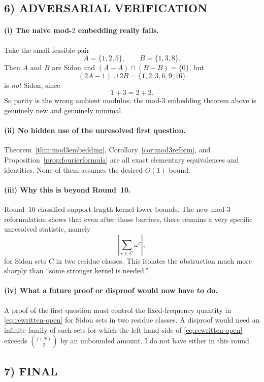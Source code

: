\subsection{6) ADVERSARIAL VERIFICATION}

\paragraph{(i) The naive mod-$2$ embedding really fails.}
Take the small feasible pair
\[
A=\{1,2,5\},
\qquad
B=\{1,3,8\}.
\]
Then $A$ and $B$ are Sidon and $(A-A)\cap(B-B)=\{0\}$, but
\[
(2A-1)\cup 2B = \{1,2,3,6,9,16\}
\]
is \emph{not} Sidon, since
\[
1+3=2+2.
\]
So parity is the wrong ambient modulus; the mod-$3$ embedding theorem above is genuinely new and genuinely minimal.

\paragraph{(ii) No hidden use of the unresolved first question.}
Theorem~\ref{thm:mod3embedding}, Corollary~\ref{cor:mod3reform}, and Proposition~\ref{prop:fourierformula} are all exact elementary equivalences and identities.  None of them assumes the desired $O(1)$ bound.

\paragraph{(iii) Why this is beyond Round~10.}
Round~10 classified support-length kernel lower bounds.  The new mod-$3$ reformulation shows that even after those barriers, there remains a very specific unresolved statistic, namely
\[
\left|\sum_{c\in C}\omega^c\right|,
\]
for Sidon sets $C$ in two residue classes.  This isolates the obstruction much more sharply than ``some stronger kernel is needed.''

\paragraph{(iv) What a future proof or disproof would now have to do.}
A proof of the first question must control the fixed-frequency quantity in \eqref{eq:rewritten-open} for Sidon sets in two residue classes.  A disproof would need an infinite family of such sets for which the left-hand side of \eqref{eq:rewritten-open} exceeds $\binom{f(N)}{2}$ by an unbounded amount.  I do not have either in this round.

\subsection{7) FINAL}

